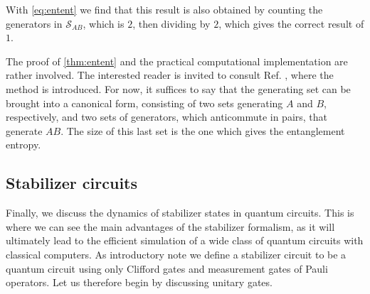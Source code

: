 With \cref{eq:entent} we find that this result is also obtained by counting the
generators in $\mathcal{S}_{AB}$, which is $2$, then dividing by $2$, which
gives the correct result of $1$. 

The proof of \cref{thm:entent} and the practical computational implementation
are rather involved. The interested reader is invited to consult Ref.
\cite{fattalEntanglementStabilizerFormalism2004}, where the method is
introduced. For now, it suffices to say that the generating set can be brought
into a canonical form, consisting of two sets generating $A$ and $B$,
respectively, and two sets of generators, which anticommute in pairs, that
generate $AB$. The size of this last set is the one which gives the
entanglement entropy.

\subsection{Stabilizer circuits}

Finally, we discuss the dynamics of stabilizer states in quantum circuits. This
is where we can see the main advantages of the stabilizer formalism, as it will
ultimately lead to the efficient simulation of a wide class of quantum circuits
with classical computers. 
As introductory note we define a stabilizer circuit to be a quantum
circuit using only Clifford gates and measurement gates of Pauli operators. Let
us therefore begin by discussing unitary gates.

